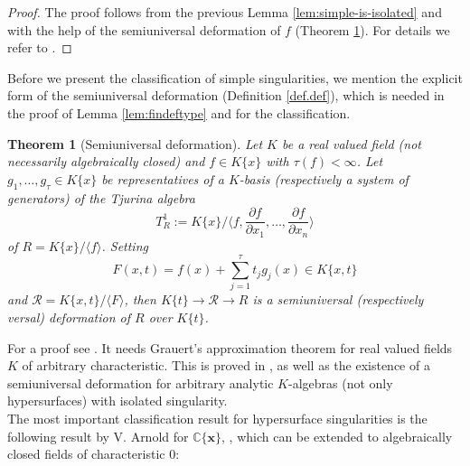 \documentclass[11pt]{article}
\newtheorem{Theorem}[Definition]{Theorem}
\newcommand{\C}{{\mathbb C}}
\newcommand{\kr}{{\mathcal R}}
\newcommand{\bx}{\boldsymbol{x}}
\begin{document}
\begin{proof}
The proof follows from the previous Lemma \ref{lem:simple-is-isolated} and with the help of the semiuniversal deformation of $f$ (Theorem \ref{thm.sudef}).
For details we refer to \cite[Lemma 3.3.31]{GLS25}.
\end{proof}

Before we present the classification of simple singularities, we mention the explicit form of the semiuniversal deformation (Definition \ref{def.def}), which is needed in the proof of Lemma \ref{lem:findeftype} and for the classification.

\begin{Theorem}[Semiuniversal deformation]\label{thm.sudef} Let $K$ be a real valued field (not necessarily algebraically closed) and
$f\in K\{x\}$ with $\tau(f)<\infty$. Let $g_1,\dots,g_{\tau}\in K\{x\}$ be representatives of
a $K$-basis (respectively a system of generators) of the
 Tjurina algebra
$$ T^1_R:= K\{x\}/\textstyle\big\langle f,\frac{\partial
f}{\partial x_1},\dots,\frac{\partial f}{\partial
x_n}\big\rangle$$
of $R= K\{x\}/\langle f \rangle$.
Setting 
$$F(x,t)= f(x)+\sum_{j=1}^{\tau} t_jg_j(x) \in K\{x,t\}$$
and
$\kr =  K\{x,t\} / \langle F \rangle$, then 
$K\{t\} \to \kr \to R$
is a semiuniversal (respectively versal) deformation of
$R$ over $K\{t\}$.
\end{Theorem}

For a proof see \cite[Corollary 6.5]{GP25}. It needs Grauert's approximation theorem for real valued fields $K$ of arbitrary characteristic. This is proved in \cite{GP25}, as well as the existence of a semiuniversal deformation for arbitrary analytic $K$-algebras (not only hypersurfaces) with isolated singularity.\\
 
The most important classification result for hypersurface singularities is the following result by V. Arnold for $\C\{\bx\}$, \cite{AGV}, which can be extended to algebraically closed fields of characteristic 0:
\end{document}
